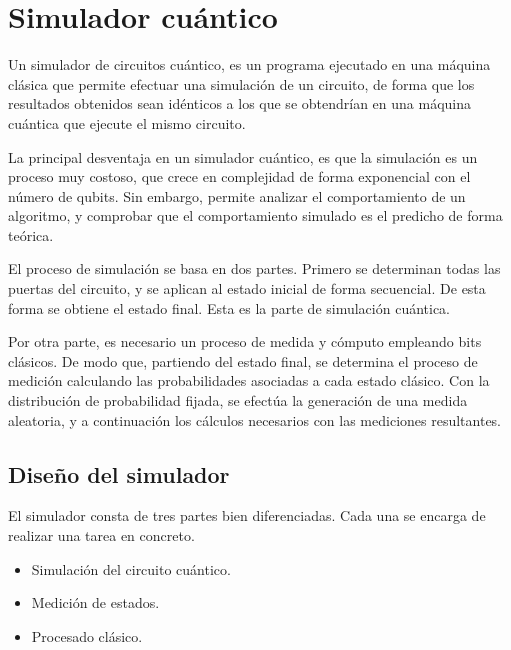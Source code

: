 \chapter{Simulador cuántico}

Un simulador de circuitos cuántico, es un programa ejecutado en una máquina 
clásica que permite efectuar una simulación de un circuito, de forma que los 
resultados obtenidos sean idénticos a los que se obtendrían en una máquina 
cuántica que ejecute el mismo circuito.

La principal desventaja en un simulador cuántico, es que la simulación es un 
proceso muy costoso, que crece en complejidad de forma exponencial con el número 
de qubits. Sin embargo, permite analizar el comportamiento de un algoritmo, y 
comprobar que el comportamiento simulado es el predicho de forma teórica.

El proceso de simulación se basa en dos partes. Primero se determinan todas las 
puertas del circuito, y se aplican al estado inicial de forma secuencial. De 
esta forma se obtiene el estado final. Esta es la parte de simulación cuántica.

Por otra parte, es necesario un proceso de medida y cómputo empleando bits 
clásicos. De modo que, partiendo del estado final, se determina el proceso de 
medición calculando las probabilidades asociadas a cada estado clásico. Con la 
distribución de probabilidad fijada, se efectúa la generación de una medida 
aleatoria, y a continuación los cálculos necesarios con las mediciones 
resultantes.

\section{Diseño del simulador}
El simulador consta de tres partes bien diferenciadas. Cada una se encarga de 
realizar una tarea en concreto.
%
\begin{itemize}
\item Simulación del circuito cuántico.
\item Medición de estados.
\item Procesado clásico.
\end{itemize}

